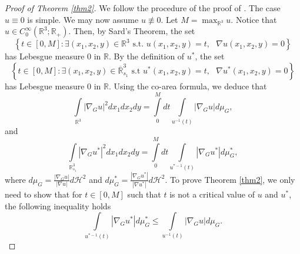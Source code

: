 \documentclass[10pt, reqno]{amsart}
\begin{document}
	\begin{proof}[Proof of Theorem \ref{thm2}]
		We follow the procedure of the proof of \cite[Theorem 2]{nga}. The case $u \equiv 0$ is simple. We may now assume $u \not\equiv 0$. Let $M = \max_{\mathbb{R}^3} u$. Notice that $u \in C^\infty_0 ( \mathbb{R}^3; \mathbb{R}_+)$. Then, by Sard's Theorem, the set
		$$\left\{ t\in[0,M]: \exists (x_1,x_2,y) \in \mathbb{R}^3 \textrm{ s.t. } u(x_1,x_2,y) = t, \textrm{ } \nabla u(x_1,x_2,y) = 0\right\}$$
		has Lebesgue measure 0 in $\mathbb{R}$. By the definition of $u^*$, the set
		$$\left\{ t\in[0,M]: \exists (x_1,x_2,y) \in \overline{\mathbb{R}}^3_{s_1} \textrm{ s.t } u^*(x_1,x_2,y) = t, \textrm{ } \nabla u^*(x_1,x_2,y) = 0\right\}$$
		has Lebesgue measure 0 in $\mathbb{R}$. Using the co-area formula, we deduce that
		$$ \int\limits_{\mathbb{R}^3} |\nabla_G u |^2 dx_1dx_2dy = \int\limits_0^M dt\int\limits_{u^{-1}(t)} |\nabla_G u |d\mu_G,$$
		and
		$$ \int\limits_{\mathbb{R}^3_{s_1}} |\nabla_G u^* |^2 dx_1dx_2dy = \int\limits_0^M dt\int\limits_{u^{*-1}(t)} |\nabla_G u^* |d\mu^*_G,$$
		where $d\mu_G = \frac{|\nabla_G u|}{|\nabla u|}d\mathcal{H}^2$ and $d\mu^*_G = \frac{|\nabla_G u^*|}{|\nabla u^*|}d\mathcal{H}^2$. To prove Theorem \ref{thm2}, we only need to show that for $t\in[0,M]$ such that $t$ is not a critical value of $u$ and $u^*$, the following inequality holds
		\begin{equation}\label{eqn9}
			\int\limits_{u^{*-1}(t)} |\nabla_G u^* |d\mu^*_G \leq \int\limits_{u^{-1}(t)} |\nabla_G u |d\mu_G.
		\end{equation}
		

\end{proof}
\end{document}

